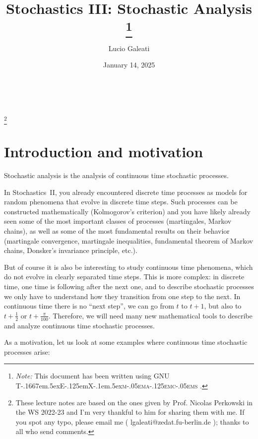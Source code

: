 \documentclass{article}
\newcommand{\TeXmacs}{T\kern-.1667em\lower.5ex\hbox{E}\kern-.125emX\kern-.1em\lower.5ex\hbox{\textsc{m\kern-.05ema\kern-.125emc\kern-.05ems}}}
\newcommand{\citetexmacs}[1]{This document has been written using GNU {\TeXmacs} \cite{#1}.}
\newcommand{\tmnote}[1]{\thanks{\textit{Note:} #1}}
\newcommand{\1}{\1}
\begin{document}
\

\title{
  Stochastics III: Stochastic Analysis
  \tmnote{{\citetexmacs{TeXmacs:website}}}
}

\author{Lucio Galeati}

\date{January 14, 2025}

\maketitle

\footnote{These lecture notes are based on the ones given by Prof. Nicolas
Perkowski in the WS 2022-23 and I'm very thankful to him for sharing them with
me. If you spot any typo, please email me ( lgaleati@zedat.fu-berlin.de );
thanks to all who send comments.}

{\tableofcontents}

\section*{Introduction and motivation}

Stochastic analysis is the analysis of continuous time stochastic processes.

In Stochastics~II, you already encountered discrete time processes as models
for random phenomena that evolve in discrete time steps. Such processes can be
constructed mathematically (Kolmogorov's criterion) and you have likely
already seen some of the most important classes of processes (martingales,
Markov chains), as well as some of the most fundamental results on their
behavior (martingale convergence, martingale inequalities, fundamental theorem
of Markov chains, Donsker's invariance principle, etc.).

But of course it is also be interesting to study continuous time phenomena,
which do not evolve in clearly separated time steps. This is more complex: in
discrete time, one time is following after the next one, and to describe
stochastic processes we only have to understand how they transition from one
step to the next. In continuous time there is no ``next step'', we can go from
$t$ to $t + 1$, but also to $t + \frac{1}{2}$ or $t + \frac{\pi}{100}$.
Therefore, we will need many new mathematical tools to describe and analyze
continuous time stochastic processes.

As a motivation, let us look at some examples where continuous time stochastic
processes arise:
\end{document}
